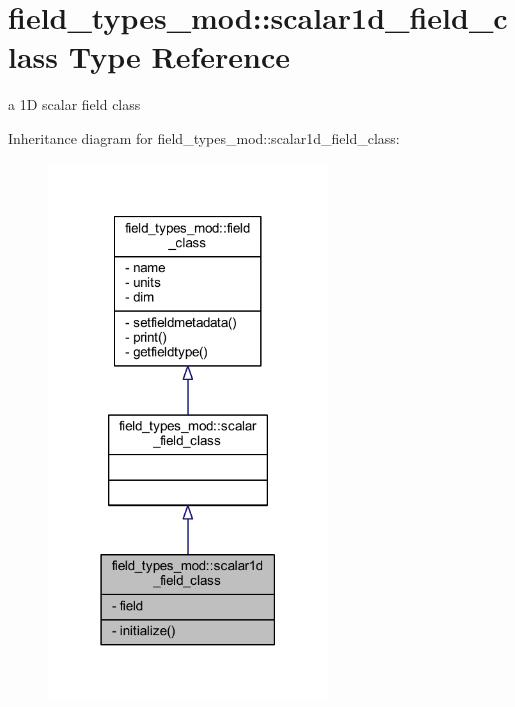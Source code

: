 \hypertarget{structfield__types__mod_1_1scalar1d__field__class}{}\section{field\+\_\+types\+\_\+mod\+:\+:scalar1d\+\_\+field\+\_\+class Type Reference}
\label{structfield__types__mod_1_1scalar1d__field__class}


a 1D scalar field class  




Inheritance diagram for field\+\_\+types\+\_\+mod\+:\+:scalar1d\+\_\+field\+\_\+class\+:\nopagebreak
\begin{figure}[H]
\begin{center}
\leavevmode
\includegraphics[width=210pt]{structfield__types__mod_1_1scalar1d__field__class__inherit__graph}
\end{center}
\end{figure}


